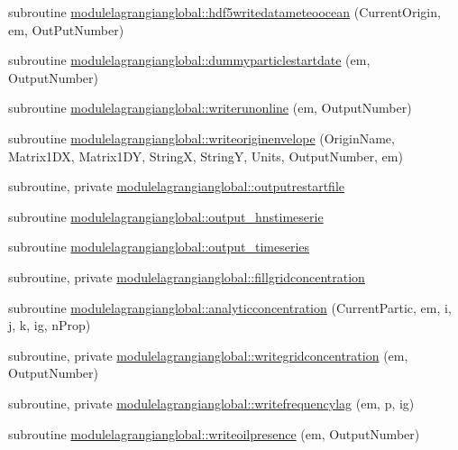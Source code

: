 \begin{DoxyCompactItemize}
\item 
subroutine \mbox{\hyperlink{namespacemodulelagrangianglobal_ac7151a37e939cec76ecc163750973cfc}{modulelagrangianglobal\+::hdf5writedatameteoocean}} (Current\+Origin, em, Out\+Put\+Number)
\item 
subroutine \mbox{\hyperlink{namespacemodulelagrangianglobal_aa302d13b1ed3a00c85939a4f07802591}{modulelagrangianglobal\+::dummyparticlestartdate}} (em, Output\+Number)
\item 
subroutine \mbox{\hyperlink{namespacemodulelagrangianglobal_af58c4faddb51056e6ab9190e049a564b}{modulelagrangianglobal\+::writerunonline}} (em, Output\+Number)
\item 
subroutine \mbox{\hyperlink{namespacemodulelagrangianglobal_a50d81f13e10670a1b2e699246cbdaf1f}{modulelagrangianglobal\+::writeoriginenvelope}} (Origin\+Name, Matrix1\+DX, Matrix1\+DY, StringX, StringY, Units, Output\+Number, em)
\item 
subroutine, private \mbox{\hyperlink{namespacemodulelagrangianglobal_a9eaa20c6b0f8ebb9961c4eb75eaffb59}{modulelagrangianglobal\+::outputrestartfile}}
\item 
subroutine \mbox{\hyperlink{namespacemodulelagrangianglobal_ae56aec86f2575e89f5bacc78d75192a8}{modulelagrangianglobal\+::output\+\_\+hnstimeserie}}
\item 
subroutine \mbox{\hyperlink{namespacemodulelagrangianglobal_a9965ea6d7045ff51397b7c8dcddf580c}{modulelagrangianglobal\+::output\+\_\+timeseries}}
\item 
subroutine, private \mbox{\hyperlink{namespacemodulelagrangianglobal_ac90a060ac9ab05f2c54c45b4b76ca984}{modulelagrangianglobal\+::fillgridconcentration}}
\item 
subroutine \mbox{\hyperlink{namespacemodulelagrangianglobal_a8a4e3b4aa0ee023ec48a0d9e44b5df43}{modulelagrangianglobal\+::analyticconcentration}} (Current\+Partic, em, i, j, k, ig, n\+Prop)
\item 
subroutine, private \mbox{\hyperlink{namespacemodulelagrangianglobal_a071a32ced5fdfb667319483a8fd208b7}{modulelagrangianglobal\+::writegridconcentration}} (em, Output\+Number)
\item 
subroutine, private \mbox{\hyperlink{namespacemodulelagrangianglobal_a091fa515c0c76fbe52d2c31ad026151d}{modulelagrangianglobal\+::writefrequencylag}} (em, p, ig)
\item 
subroutine \mbox{\hyperlink{namespacemodulelagrangianglobal_ab6a14231f1191c9852f886b90950db80}{modulelagrangianglobal\+::writeoilpresence}} (em, Output\+Number)
\item 

\end{DoxyCompactItemize}
